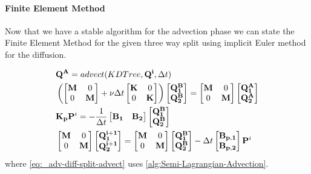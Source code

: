 \paragraph{Finite Element Method}
Now that we have a stable algorithm for the advection phase we can state the Finite Element Method for the given three way split using implicit Euler method for the diffusion.


\begin{align}
	&\mathbf{Q^A} = advect(KDTree, \mathbf{Q^{i}}, \Delta t) \label{eq:_adv-diff-split-advect}\\
		&\left(\begin{bmatrix}
		\mathbf{M} & 0 \\
		0 & \mathbf{M}
	\end{bmatrix} + \nu\Delta t\begin{bmatrix}
		\mathbf{K} & 0 \\
		0 & \mathbf{K}
	\end{bmatrix}\right)\begin{bmatrix}
		\mathbf{Q^{B}_1} \\
		\mathbf{Q^{B}_2}
	\end{bmatrix} = \begin{bmatrix}
		\mathbf{M} & 0 \\
		0 & \mathbf{M}
	\end{bmatrix}\begin{bmatrix}
		\mathbf{Q^{A}_1} \\
		\mathbf{Q^{A}_2}
	\end{bmatrix} \label{eq:_adv-diff-split-diffuse}\\
	&\mathbf{K_p}\mathbf{P}^i = -\frac{1}{\Delta t} \begin{bmatrix}
		\mathbf{B_1} & \mathbf{B_2}
	\end{bmatrix} \begin{bmatrix}
		\mathbf{Q^{B}_1} \\
		\mathbf{Q^{B}_2}
	\end{bmatrix} \label{eq:_adv-diff-split-pressure}\\
	&\begin{bmatrix}
		\mathbf{M} & 0 \\
		0 & \mathbf{M}
	\end{bmatrix} \begin{bmatrix}
		\mathbf{Q^{i+1}_1} \\
		\mathbf{Q^{i+1}_2}
	\end{bmatrix} =	\begin{bmatrix}
		\mathbf{M} & 0 \\
		0 & \mathbf{M}
	\end{bmatrix} \begin{bmatrix}
		\mathbf{Q^{B}_1} \\
		\mathbf{Q^{B}_2}
	\end{bmatrix} - \Delta t \begin{bmatrix}
		\mathbf{B_{p,1}} \\
		\mathbf{B_{p,2}}
	\end{bmatrix} \mathbf{P}^i \label{eq:_adv-diff-split-velicity-mass}
\end{align}
where \cref{eq:_adv-diff-split-advect} uses \cref{alg:Semi-Lagrangian-Advection}.

